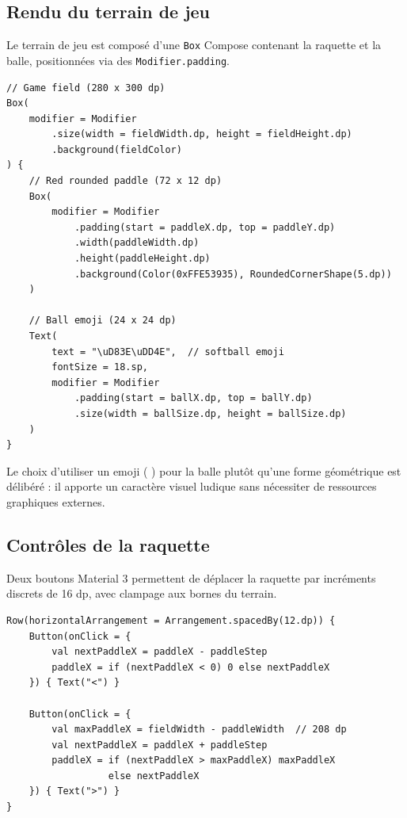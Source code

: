 \documentclass[12pt,a4paper]{report}
\begin{document}
\subsection{Rendu du terrain de jeu}
Le terrain de jeu est compos\'e d'une \texttt{Box} Compose contenant la raquette et la balle, positionn\'ees via des \texttt{Modifier.padding}.

\begin{lstlisting}[caption={Rendu du terrain de jeu avec la raquette et la balle}, label=lst:field]
// Game field (280 x 300 dp)
Box(
    modifier = Modifier
        .size(width = fieldWidth.dp, height = fieldHeight.dp)
        .background(fieldColor)
) {
    // Red rounded paddle (72 x 12 dp)
    Box(
        modifier = Modifier
            .padding(start = paddleX.dp, top = paddleY.dp)
            .width(paddleWidth.dp)
            .height(paddleHeight.dp)
            .background(Color(0xFFE53935), RoundedCornerShape(5.dp))
    )

    // Ball emoji (24 x 24 dp)
    Text(
        text = "\uD83E\uDD4E",  // softball emoji
        fontSize = 18.sp,
        modifier = Modifier
            .padding(start = ballX.dp, top = ballY.dp)
            .size(width = ballSize.dp, height = ballSize.dp)
    )
}
\end{lstlisting}

Le choix d'utiliser un emoji (\,\,) pour la balle plut\^ot qu'une forme g\'eom\'etrique est d\'elib\'er\'e : il apporte un caract\`ere visuel ludique sans n\'ecessiter de ressources graphiques externes.

\subsection{Contr\^oles de la raquette}
Deux boutons Material 3 permettent de d\'eplacer la raquette par incr\'ements discrets de 16 dp, avec clampage aux bornes du terrain.

\begin{lstlisting}[caption={Boutons de contr\^ole de la raquette avec limitation aux bornes}, label=lst:controls]
Row(horizontalArrangement = Arrangement.spacedBy(12.dp)) {
    Button(onClick = {
        val nextPaddleX = paddleX - paddleStep
        paddleX = if (nextPaddleX < 0) 0 else nextPaddleX
    }) { Text("<") }

    Button(onClick = {
        val maxPaddleX = fieldWidth - paddleWidth  // 208 dp
        val nextPaddleX = paddleX + paddleStep
        paddleX = if (nextPaddleX > maxPaddleX) maxPaddleX
                  else nextPaddleX
    }) { Text(">") }
}
\end{lstlisting}
\end{document}
